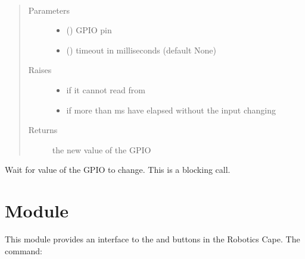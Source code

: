 \documentclass[letterpaper,10pt,english]{sphinxmanual}
\begin{document}

\begin{fulllineitems}
\label{\detokenize{index:rcpy.gpio.read}}~\begin{quote}\begin{description}
\item[{Parameters}] \leavevmode\begin{itemize}
\item {} 
 () \textendash{} GPIO pin

\item {} 
 () \textendash{} timeout in milliseconds (default None)

\end{itemize}

\item[{Raises}] \leavevmode\begin{itemize}
\item {} 
 \textendash{} if it cannot read from 

\item {} 
{\hyperref[\detokenize{index:rcpy.gpio.InputTimeout}]{}} \textendash{} if more than  ms have elapsed without the input changing

\end{itemize}

\item[{Returns}] \leavevmode
the new value of the GPIO 

\end{description}\end{quote}

Wait for value of the GPIO  to change. This is a blocking call.

\end{fulllineitems}



\chapter{Module }
\label{\detokenize{index:module-rcpy.button}}\label{\detokenize{index:module-rcpy-button}}\label{\detokenize{index:rcpy-button}}
This module provides an interface to the  and  buttons in
the Robotics Cape. The command:
\end{document}
